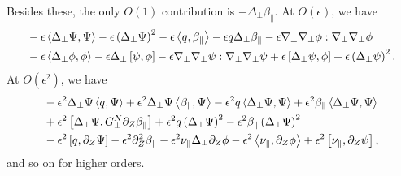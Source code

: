 \documentclass{article}
\newcommand{\para}{\parallel}
\newcommand{\ep}{\epsilon}
\newcommand{\np}{\nabla_\perp}
\newcommand{\lap}{\Delta_\perp}
\newcommand{\p}{\partial}
\newcommand{\fr}{\frac{1+\ep q}{1+\ep\beta_\para}}
\newcommand{\frinv}{\frac{1+\ep\beta_\para}{1+\ep q}}
\newcommand{\GN}{G_\perp^N}
\newcommand{\pth} [1] {\left( #1 \right) }
\newcommand{\br} [1] {\left[ #1 \right] }
\begin{document}
\begin{comment}\begin{align*}
    - \beta_0\ep^{-1} &\Braket{\fr, \pi\pth{\frinv}} - \beta_0\ep^{-1} \fr\lap\pi\pth{\frinv} = \\
    &-\beta_0\pi'(1) \lap\beta_\para + \beta_0\pi'(1) \lap q - \beta_0\ep\pi''(1) \beta_\para\lap \beta_\para \\ 
    &+ \beta_0\ep\pi''(1) \beta_\para\lap q + \beta_0\ep\pi''(1) q\lap\beta_\para - \beta_0\ep\pi''(1) q\lap q \\ 
    &- \beta_0\ep\pi''(1) \left|\np\beta_\para\right|^2 + 2\beta_0\ep\pi''(1) \Braket{\beta_\para,q} - \beta_0\ep\pi''(1) |\np q|^2 \\ 
    &- \beta_0\ep\pi'(1) q\lap q + 2\beta_0\ep\pi'(1) \Braket{\beta_\para,q} - \beta_0\ep\pi'(1) \left|\np q\right|^2 \\ 
    &+ \beta_0\ep\pi'(1) \left|\np\beta_\para\right|^2 + \beta_0\ep\pi'(1) \beta_\para\lap\beta_\para + O\pth{\beta_0\ep^2}. 
\end{align*}\end{comment}
Besides these, the only $O(1)$ contribution is $-\lap\beta_\para$. At $O(\ep)$, we have
\begin{align*}
    &- \ep\Braket{\lap\Psi, \Psi} - \ep\pth{\lap\Psi}^2 - \ep\Braket{q,\beta_\para} - \ep q\lap\beta_\para - \ep\np\np\phi:\np\np\phi \\
    &- \ep\Braket{\lap\phi, \phi} - \ep\lap\br{\psi,\phi} - \ep\np\np\psi:\np\np\psi + \ep\br{\lap\psi, \phi} + \ep\pth{\lap\psi}^2.
\end{align*}
At $O(\ep^2)$, we have
\begin{align*}
    &- \ep^2\lap\Psi \Braket{q,\Psi} + \ep^2\lap\Psi \Braket{\beta_\para,\Psi} - \ep^2q \Braket{\lap\Psi, \Psi} + \ep^2 \beta_\para\Braket{\lap\Psi, \Psi} \\ 
    &+ \ep^2\br{\lap\Psi, \GN\p_Z\beta_\para} + \ep^2q\pth{\lap\Psi}^2 - \ep^2\beta_\para\pth{\lap\Psi}^2 \\
    &- \ep^2\br{q, \p_Z\Psi} - \ep^2\p^2_Z\beta_\para - \ep^2\nu_\para \lap\p_Z\phi - \ep^2\Braket{\nu_\para, \p_Z\phi} + \ep^2\br{\nu_\para, \p_Z\psi},
\end{align*}
and so on for higher orders. 
\end{document}

